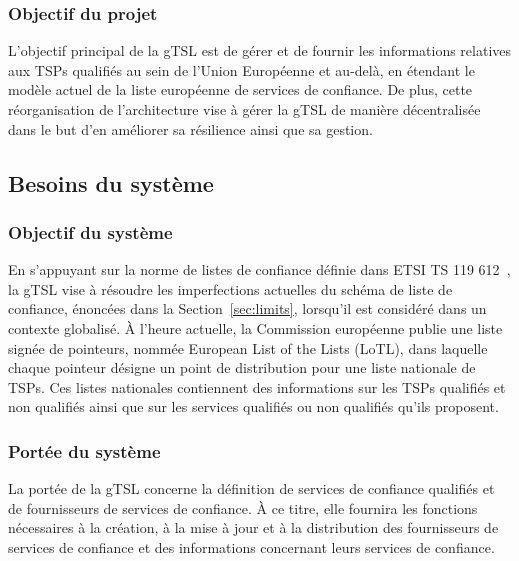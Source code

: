 \documentclass{tnreport}
\begin{document}
\subsubsection{Objectif du projet}

L'objectif principal de la gTSL est de gérer et de fournir les informations relatives aux TSPs qualifiés au sein de l'Union Européenne et au-delà, en étendant le modèle actuel de la liste européenne de services de confiance. De plus, cette réorganisation de l'architecture vise à gérer la gTSL de manière décentralisée dans le but d'en améliorer sa résilience ainsi que sa gestion.

\subsection{Besoins du système}
\label{sec:system-requirements}

\subsubsection{Objectif du système}

En s'appuyant sur la norme de listes de confiance définie dans ETSI TS 119 612~\cite{ETSITS119612}, la gTSL vise à résoudre les imperfections actuelles du schéma de liste de confiance, énoncées dans la Section~\ref{sec:limits}, lorsqu'il est considéré dans un contexte globalisé. 
À l'heure actuelle, la Commission européenne publie une liste signée de pointeurs, nommée European List of the Lists (LoTL), dans laquelle chaque pointeur désigne un point de distribution pour une liste nationale de TSPs. 
Ces listes nationales contiennent des informations sur les TSPs qualifiés et non qualifiés ainsi que sur les services qualifiés ou non qualifiés qu'ils proposent.

\subsubsection{Portée du système}

La portée de la gTSL concerne la définition de services de confiance qualifiés et de fournisseurs de services de confiance.
À ce titre, elle fournira les fonctions nécessaires à la création, à la mise à jour et à la distribution des fournisseurs de services de confiance et des informations concernant leurs services de confiance.
\end{document}
